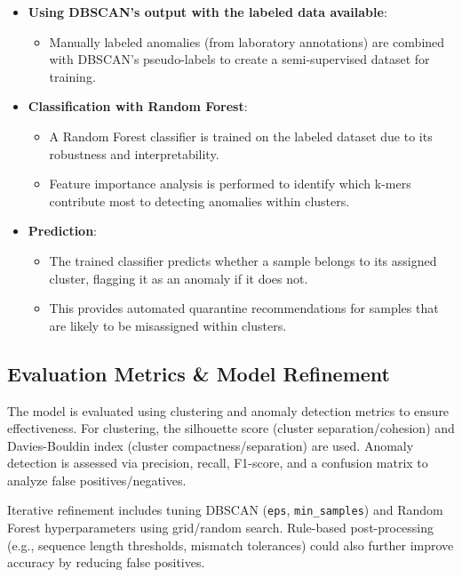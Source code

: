 \begin{itemize}
    \item \textbf{Using DBSCAN's output with the labeled data available}:
    \begin{itemize}
        \item Manually labeled anomalies (from laboratory annotations) are combined with DBSCAN’s pseudo-labels to create a semi-supervised dataset for training.
    \end{itemize}

    \item \textbf{Classification with Random Forest}:
    \begin{itemize}
        \item A Random Forest classifier is trained on the labeled dataset due to its robustness and interpretability.
        \item Feature importance analysis is performed to identify which k-mers contribute most to detecting anomalies within clusters.
    \end{itemize}

    \item \textbf{Prediction}:
    \begin{itemize}
        \item The trained classifier predicts whether a sample belongs to its assigned cluster, flagging it as an anomaly if it does not.
        \item This provides automated quarantine recommendations for samples that are likely to be misassigned within clusters.
    \end{itemize}
\end{itemize}

\subsection{Evaluation Metrics \& Model Refinement}
The model is evaluated using clustering and anomaly detection metrics to ensure effectiveness. For clustering, the silhouette score (cluster separation/cohesion) and Davies-Bouldin index (cluster compactness/separation) are used. Anomaly detection is assessed via precision, recall, F1-score, and a confusion matrix to analyze false positives/negatives. 

Iterative refinement includes tuning DBSCAN (\texttt{eps}, \texttt{min\_samples}) and Random Forest hyperparameters using grid/random search. Rule-based post-processing (e.g., sequence length thresholds, mismatch tolerances) could also further improve accuracy by reducing false positives.

